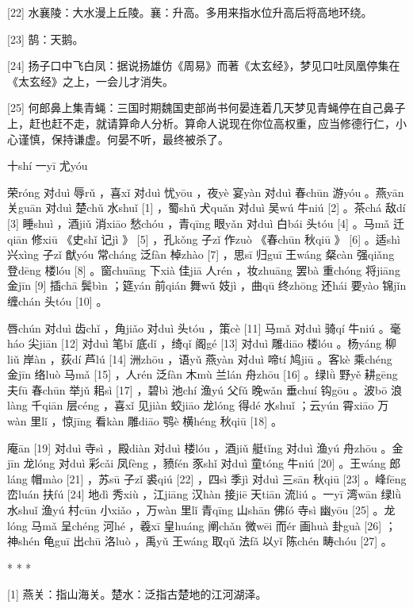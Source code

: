 \documentclass[12pt,UTF8]{ctexbook}
\begin{document}
[22] 水襄陵：大水漫上丘陵。襄：升高。多用来指水位升高后将高地环绕。

[23] 鹄：天鹅。

[24] 扬子口中飞白凤：据说扬雄仿《周易》而著《太玄经》，梦见口吐凤凰停集在《太玄经》之上，一会儿才消失。

[25] 何郎鼻上集青蝇：三国时期魏国吏部尚书何晏连着几天梦见青蝇停在自己鼻子上，赶也赶不走，就请算命人分析。算命人说现在你位高权重，应当修德行仁，小心谨慎，保持谦虚。何晏不听，最终被杀了。





十shí 一yī 尤yóu


荣róng 对duì 辱rǔ ，喜xǐ 对duì 忧yōu ，夜yè 宴yàn 对duì 春chūn 游yóu 。燕yān 关guān 对duì 楚chǔ 水shuǐ [1] ，蜀shǔ 犬quǎn 对duì 吴wú 牛niú [2] 。茶chá 敌dí [3] 睡shuì ，酒jiǔ 消xiāo 愁chóu ，青qīng 眼yǎn 对duì 白bái 头tóu [4] 。马mǎ 迁qiān 修xiū 《史shǐ 记jì 》 [5] ，孔kǒng 子zǐ 作zuò 《春chūn 秋qiū 》 [6] 。适shì 兴xìng 子zǐ 猷yóu 常cháng 泛fàn 棹zhào [7] ，思sī 归guī 王wáng 粲càn 强qiǎng 登dēng 楼lóu [8] 。窗chuāng 下xià 佳jiā 人rén ，妆zhuāng 罢bà 重chóng 将jiāng 金jīn [9] 插chā 鬓bìn ；筵yán 前qián 舞wǔ 妓jì ，曲qū 终zhōng 还hái 要yào 锦jǐn 缠chán 头tóu [10] 。

唇chún 对duì 齿chǐ ，角jiǎo 对duì 头tóu ，策cè [11] 马mǎ 对duì 骑qí 牛niú 。毫háo 尖jiān [12] 对duì 笔bǐ 底dǐ ，绮qǐ 阁gé [13] 对duì 雕diāo 楼lóu 。杨yáng 柳liǔ 岸àn ，荻dí 芦lú [14] 洲zhōu ，语yǔ 燕yàn 对duì 啼tí 鸠jiū 。客kè 乘chéng 金jīn 络luò 马mǎ [15] ，人rén 泛fàn 木mù 兰lán 舟zhōu [16] 。绿lǜ 野yě 耕gēng 夫fū 春chūn 举jǔ 耜sì [17] ，碧bì 池chí 渔yú 父fǔ 晚wǎn 垂chuí 钩gōu 。波bō 浪làng 千qiān 层céng ，喜xǐ 见jiàn 蛟jiāo 龙lóng 得dé 水shuǐ ；云yún 霄xiāo 万wàn 里lǐ ，惊jīng 看kàn 雕diāo 鹗è 横héng 秋qiū [18] 。

庵ān [19] 对duì 寺sì ，殿diàn 对duì 楼lóu ，酒jiǔ 艇tǐng 对duì 渔yú 舟zhōu 。金jīn 龙lóng 对duì 彩cǎi 凤fèng ，豮fén 豕shǐ 对duì 童tóng 牛niú [20] 。王wáng 郎láng 帽mào [21] ，苏sū 子zǐ 裘qiú [22] ，四sì 季jì 对duì 三sān 秋qiū [23] 。峰fēng 峦luán 扶fú [24] 地dì 秀xiù ，江jiāng 汉hàn 接jiē 天tiān 流liú 。一yī 湾wān 绿lǜ 水shuǐ 渔yú 村cūn 小xiǎo ，万wàn 里lǐ 青qīng 山shān 佛fó 寺sì 幽yōu [25] 。龙lóng 马mǎ 呈chéng 河hé ，羲xī 皇huáng 阐chǎn 微wēi 而ér 画huà 卦guà [26] ；神shén 龟guī 出chū 洛luò ，禹yǔ 王wáng 取qǔ 法fǎ 以yǐ 陈chén 畴chóu [27] 。



* * *



[1] 燕关：指山海关。楚水：泛指古楚地的江河湖泽。
\end{document}
